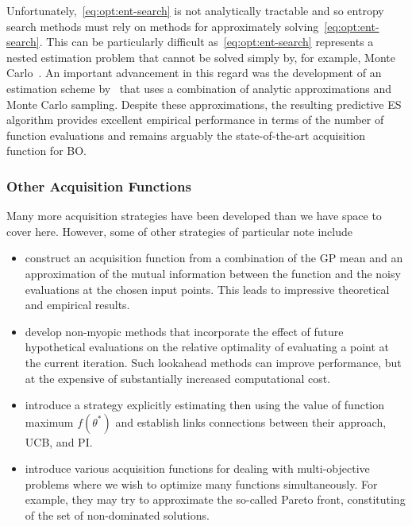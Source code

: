 Unfortunately,~\eqref{eq:opt:ent-search} is not analytically tractable and so entropy
search methods must rely on methods for approximately solving~\eqref{eq:opt:ent-search}.  
This can be particularly difficult as~\eqref{eq:opt:ent-search} represents a nested estimation
problem that cannot be solved simply by, for example, Monte Carlo~\citep{rainforth2016pitfalls}.
An important advancement in this regard was the development of an estimation scheme
by~\cite{hernandez2014predictive} that uses a combination of analytic approximations
and Monte Carlo sampling.  Despite these approximations, the resulting predictive ES algorithm
provides excellent empirical performance in terms of the number of function 
evaluations and remains arguably the state-of-the-art acquisition function for BO.

\subsubsection{Other Acquisition Functions}
\label{sec:opt:BO:acq:other}

Many more acquisition strategies have been developed than we have space 
to cover here.  However, some of other strategies of particular note include
\begin{itemize}
	\item \cite{contal2014gaussian} construct an acquisition function from a combination
	of the GP mean and an approximation of the mutual information between the
	function and the noisy evaluations at the chosen input points.  This leads to impressive
	theoretical and empirical results.
	\item \cite{osborne2009gaussian,gonzalez2016glasses} develop
	non-myopic methods that incorporate the effect of future hypothetical evaluations on
	the relative optimality of evaluating a point at the current iteration.  Such lookahead methods
	can improve performance, but at the expensive of substantially increased computational cost.
	\item \cite{wang2016optimization} introduce a strategy explicitly estimating then using
	the value of function maximum $f(\theta^*)$ and establish links connections between their
	approach, UCB, and PI.
	\item \cite{swersky2013multi,shah2016pareto,hernandez2016predictive,feliot2017bayesian}
	introduce various acquisition functions for dealing with multi-objective problems where we
	wish to optimize many functions simultaneously.  For example, they may try to approximate
	the so-called Pareto front, constituting of the set of non-dominated solutions.
\end{itemize}

